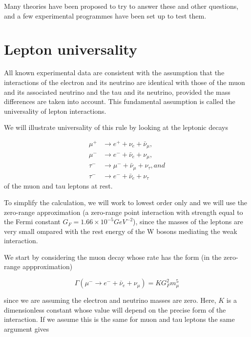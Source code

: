 Many theories have been proposed to try to answer these and other questions, and a few experimental programmes have been set up to test them. %

\section{Lepton universality}
	All known experimental data are consistent with the assumption that the interactions of the electron and its neutrino are identical with those of the muon and its associated neutrino and the tau and its neutrino, provided the mass differences are taken into account. This fundamental assumption is called the universality of lepton interactions.

	We will illustrate universality of this rule by looking at the leptonic decays \cite{MartinShaw}

	\begin{align}\label{eq2.4.1}
	\mu^{+}&\rightarrow e^{+} + \nu_{e} + \bar{\nu}_{\mu},\\
	\mu^{-}&\rightarrow e^{-} + \bar{\nu}_{e} + \nu_{\mu},\\
	\tau^{-}&\rightarrow \mu^{-} + \bar{\nu}_{\mu} + \nu_{\tau}, and\\
	\tau^{-}&\rightarrow e^{-} + \bar{\nu}_{e} + \nu_{\tau}
	\end{align}
	of the muon and tau leptons at rest. 

	To simplify the calculation, we will work to lowest order only and we will use the zero-range approximation (a zero-range point interaction with strength equal to the Fermi constant $G_{F}=1.66\times 10^{-5} GeV^{-2}$), since the masses of the leptons are very small ompared with the rest energy of the W bosons mediating the weak interaction.

	We start by considering the muon decay whose rate has the form (in the zero-range appproximation)

	\begin{equation}\label{eq2.4.2}
	\Gamma(\mu^{-}\rightarrow e^{-} + \bar{\nu}_{e} + \nu_{\mu}) = KG_{F}^{2}m_{\mu}^{5}
	\end{equation}

	since we are assuming the electron and neutrino masses are zero. Here, $K$ is a dimensionless constant whose value will depend on the precise form of the interaction. If we assume this is the same for muon and tau leptons the same argument gives

